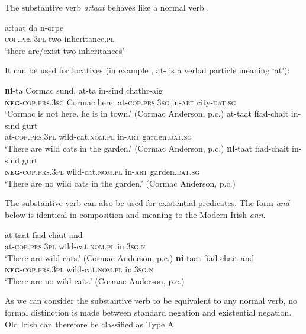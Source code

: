 \documentclass[output=paper,colorlinks,citecolor=brown]{langscibook}
\begin{document}
\begin{paperappendix}
\begin{unindented}
The substantive verb \textit{a:taat} behaves like a normal verb \citep[40]{McCone2005}.
%
\begin{exe}\ex \gll a:taat da n-orpe \\
\textsc{cop.prs.3pl} two inheritance.\textsc{pl} \\
    \glt `there are/exist two inheritances' \citep[40]{McCone2005}
    \end{exe}

It can be used for locatives (in example , at- is a verbal particle meaning `at'):

\begin{exe}\ex
    \gll \textbf{ni}-ta Cormac sund,  at-ta in-sind chathr-aig \\
\textbf{\textsc{neg}}\textsc{-cop.prs.3sg} Cormac here,  at-\textsc{cop.prs.3sg} in-\textsc{art}  city-\textsc{dat.sg} \\
    \glt `Cormac is not here, he is in town.' (Cormac Anderson, p.c.)
\ex\label{ex:ieur-app-irish-Cormac} 
    \gll at-taat fíad-chait in-sind gurt \\
at-\textsc{cop.prs.3pl} wild-cat.\textsc{nom.pl} in-\textsc{art} garden.\textsc{dat.sg} \\
    \glt `There are wild cats in the garden.' (Cormac Anderson, p.c.)
\ex \gll \textbf{ni}-taat fíad-chait in-sind gurt \\
\textbf{\textsc{neg}}\textsc{-cop.prs.3pl} wild-cat.\textsc{nom.pl} in-\textsc{art} garden.\textsc{dat.sg} \\
    \glt `There are no wild cats in the garden.' (Cormac Anderson, p.c.)
    \end{exe}

The substantive verb can also be used for existential predicates. The form \textit{and} below is identical in composition and meaning to the Modern Irish \textit{ann}. 
%
\begin{exe}\ex \gll at-taat fíad-chait and \\
at-\textsc{cop.prs.3pl} wild-cat.\textsc{nom.pl} in.\textsc{3sg.n} \\
    \glt `There are wild cats.' (Cormac Anderson, p.c.)
\ex \gll \textbf{ni}-taat fíad-chait and \\
\textbf{\textsc{neg}}\textsc{-cop.prs.3pl} wild-cat.\textsc{nom.pl} in.\textsc{3sg.n} \\
    \glt `There are no wild cats.' (Cormac Anderson, p.c.)
    \end{exe}

As we can consider the substantive verb to be equivalent to any normal verb, no formal distinction is made between standard negation and existential negation. Old Irish can therefore be classified as Type A.


\end{unindented}
\end{paperappendix}
\end{document}
